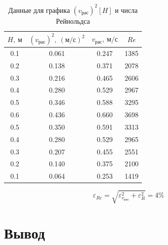 \documentclass[a4paper, 12pt]{article}
\begin{document}
\begin{table}[h!]
       
        \begin{center}
         \begin{tabular}{|c|c|c|c|}
            \hline
 $H, \: м$  & $(v_{рас})^2, \: (м/с)^2$ & $v_{рас}, \: м/с$ & $Re$\\
 \hline
 0.1 & 0.061 & 0.247 & 1385\\
\hline
 0.2 & 0.138 & 0.371 & 2078\\
\hline
 0.3 & 0.216 & 0.465 & 2606\\
\hline
 0.4 & 0.280 & 0.529 & 2967\\
\hline
 0.5 & 0.346 & 0.588 & 3295\\
\hline
 0.6 & 0.436 & 0.660 & 3698\\
\hline
 0.5 & 0.350 & 0.591 & 3313\\
\hline
 0.4 & 0.280 & 0.529 & 2965\\
\hline
 0.3 & 0.207 & 0.455 & 2551\\
\hline
 0.2 & 0.140 & 0.375 & 2100\\
\hline
 0.1 & 0.064 & 0.253 & 1419\\
\hline
 \end{tabular}
 \[ \varepsilon_{Re} = \sqrt{\varepsilon_{v_{рас}}^2 + \varepsilon_{R}^2} = 4 \%\]
         \end{center}
         \caption{Данные для графика $(v_{рас})^2[H]$ и числа Рейнольдса}
\end{table}
\newpage
\section{Вывод}
\end{document}
